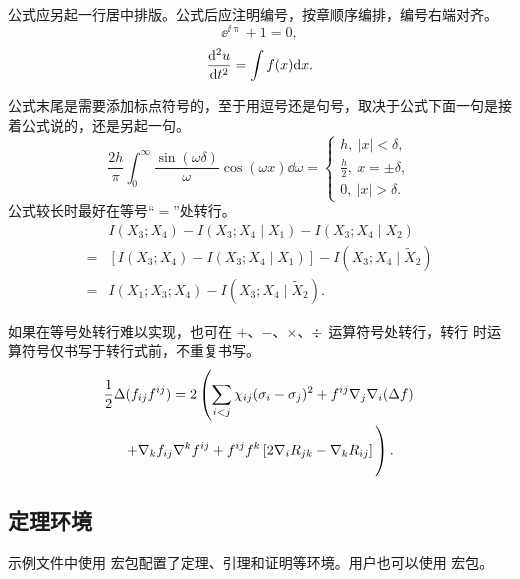 公式应另起一行居中排版。公式后应注明编号，按章顺序编排，编号右端对齐。
\begin{equation}
  \ee^{\ii\uppi} + 1 = 0,
\end{equation}
\begin{equation}
  \dv[2]{u}{t} = \int f(x) \dd x.
\end{equation}

公式末尾是需要添加标点符号的，至于用逗号还是句号，取决于公式下面一句是接着公式说的，还是另起一句。
\begin{equation}
		\frac{2h}{\pi}\int_{0}^{\infty}\frac{\sin\left( \omega\delta \right)}{\omega}
		\cos\left( \omega x \right) \dd\omega = 
		\begin{cases}
				h, \ \left| x \right| < \delta, \\
				\frac{h}{2}, \ x = \pm \delta, \\
				0, \ \left| x \right| > \delta.
		\end{cases}
\end{equation}
公式较长时最好在等号“$=$”处转行。
\begin{align}
    & I (X_3; X_4) - I (X_3; X_4 \mid X_1) - I (X_3; X_4 \mid X_2) \nonumber \\
  = & [I (X_3; X_4) - I (X_3; X_4 \mid X_1)] - I (X_3; X_4 \mid \tilde{X}_2) \\
  = & I (X_1; X_3; X_4) - I (X_3; X_4 \mid \tilde{X}_2).
\end{align}

如果在等号处转行难以实现，也可在 $+$、$-$、$\times$、$\divisionsymbol$ 运算符号处转行，转行
时运算符号仅书写于转行式前，不重复书写。
\begin{multline}
  \frac{1}{2} \Delta (f_{ij} f^{ij}) =
    2 \left(\sum_{i<j} \chi_{ij}(\sigma_{i} - \sigma_{j})^{2}
    + f^{ij} \nabla_{j} \nabla_{i} (\Delta f) \right. \\
  \left. + \nabla_{k} f_{ij} \nabla^{k} f^{ij} +
    f^{ij} f^{k} \left[2\nabla_{i}R_{jk}
    - \nabla_{k} R_{ij} \right] \vphantom{\sum_{i<j}} \right).
\end{multline}

\subsection{定理环境}

示例文件中使用  宏包配置了定理、引理和证明等环境。用户也可以使用
 宏包。

